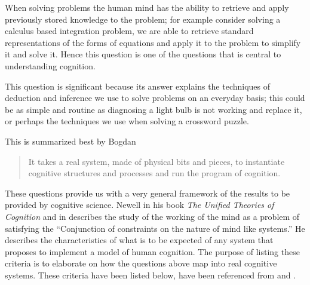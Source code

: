 

 When solving problems the human mind has the ability to
retrieve and apply previously stored knowledge to the problem; for
example consider solving a calculus based integration problem, we are
able to retrieve standard representations of the forms of equations
and apply it to the problem to simplify it and solve it. Hence this
question is one of the questions that is central to understanding
cognition.

This question is significant because its answer explains the
techniques of deduction and inference we use to solve problems on an
everyday basis; this could be as simple and routine as diagnosing a
light bulb is not working and replace it, or perhaps the techniques we
use when solving a crossword puzzle. 

This is summarized best by Bogdan \cite{Bogdan:1993aa}

\begin{quote}
It takes a real system, made of physical bits and pieces, to 
instantiate cognitive structures and processes and run the program of 
cognition.
\end{quote}

These questions provide us with a very general framework of the results to
be provided by cognitive science. Newell in his book \emph{The
Unified Theories of Cognition} \cite{Newell:1990aa} and in \cite{Newell1980135} describes the
study of the working of the mind as a problem of satisfying the
``Conjunction of constraints on the nature of mind like systems.'' He
describes the 
characteristics of what is to be expected of any system that proposes
to implement a model of human cognition. The purpose of listing
these criteria is to elaborate on how the questions above map
into real cognitive systems. These criteria have
been listed below, have been referenced from
\cite{CambridgeJournals:207162} and \cite{Newell:1990aa}.

